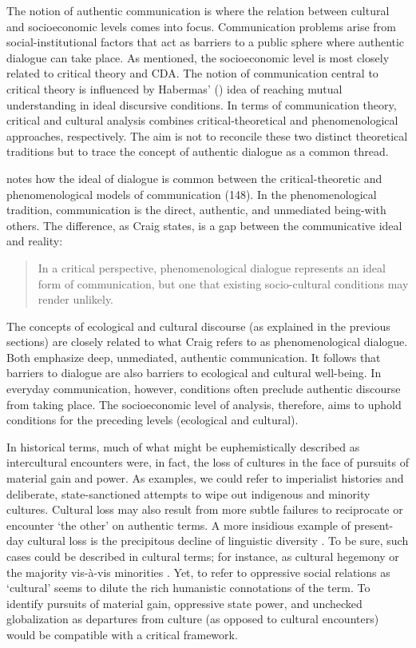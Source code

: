 The notion of authentic communication is where the relation between cultural and socioeconomic levels comes into focus. Communication problems arise from social-institutional factors that act as barriers to a public sphere where authentic dialogue can take place. As mentioned, the socioeconomic level is most closely related to critical theory and CDA. The notion of communication central to critical theory is influenced by Habermas' (\citeyear{Habermas1984a}) idea of reaching mutual understanding in ideal discursive conditions. In terms of communication theory, critical and cultural analysis combines critical-theoretical and phenomenological approaches, respectively. The aim is not to reconcile these two distinct theoretical traditions but to trace the concept of authentic dialogue as a common thread. 

\cite*{Craig1999a} notes how the ideal of dialogue is common between the critical-theoretic and phenomenological models of communication (148). In the phenomenological tradition, communication is the direct, authentic, and unmediated being-with others. The difference, as Craig states, is a gap between the communicative ideal and reality:

\begin{quote}
In a critical perspective, phenomenological dialogue represents an ideal form of communication, but one that existing socio-cultural conditions may render unlikely. \citep[148]{Craig1999a} 
\end{quote}

The concepts of ecological and cultural discourse (as explained in the previous sections) are closely related to what Craig refers to as phenomenological dialogue. Both emphasize deep, unmediated, authentic communication. It follows that barriers to dialogue are also barriers to ecological and cultural well-being. In everyday communication, however, conditions often preclude authentic discourse from taking place. The socioeconomic level of analysis, therefore, aims to uphold conditions for the preceding levels (ecological and cultural).  

In historical terms, much of what might be euphemistically described as intercultural encounters were, in fact, the loss of cultures in the face of pursuits of material gain and power. As examples, we could refer to imperialist histories and deliberate, state-sanctioned attempts to wipe out indigenous and minority cultures. Cultural loss may also result from more subtle failures to reciprocate or encounter `the other' on authentic terms. A more insidious example of present-day cultural loss is the precipitous decline of linguistic diversity \citep{Amano2014c}. To be sure, such cases could be described in cultural terms; for instance, as cultural hegemony \citep{JacksonLears1999a} or the majority vis-\`a-vis minorities \citep[4044]{Ashcroft2000a}. Yet, to refer to oppressive social relations as `cultural' seems to dilute the rich humanistic connotations of the term. To identify pursuits of material gain, oppressive state power, and unchecked globalization as departures from culture (as opposed to cultural encounters) would be compatible with a critical framework.

